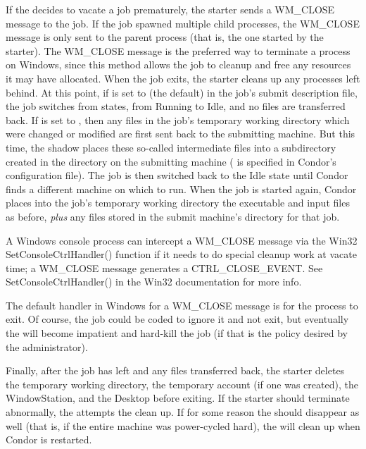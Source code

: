 If the  decides to vacate a job prematurely,
the starter sends a WM\_CLOSE message to the job.
If the job spawned multiple child processes, the WM\_CLOSE message is only
sent to the parent process (that is, the one started by the starter).
The
WM\_CLOSE message is the preferred way to terminate a process on Windows,
since this method allows the job to cleanup and free any resources it may
have allocated.
When the job exits, the starter cleans up any processes left behind.
At this point, if  is set to
 (the default) in the job's submit description file,
the job switches from states, from Running to Idle,
and no files are transferred back.
If  is set to , then any files
in the job's temporary working directory which were changed or modified are
first sent back to the submitting machine.
But this time, the shadow places these
so-called intermediate files into a subdirectory created in the
 directory on the submitting machine
( is specified in Condor's configuration file).
The job is then switched back to the Idle state until Condor finds
a different machine on which to run.
When the job is started again,
Condor places into the job's temporary working directory the executable
and input files as before,
\emph{plus} any files stored in the submit machine's  directory for that job.  

\Note A Windows console process can intercept a WM\_CLOSE message
via the Win32 SetConsoleCtrlHandler() function if it needs to do special
cleanup work at vacate time; a WM\_CLOSE message
generates a CTRL\_CLOSE\_EVENT.  See SetConsoleCtrlHandler() in the Win32
documentation for more info.

\Note The default handler in Windows for a WM\_CLOSE message is for the
process to exit.  Of course, the job could be coded to ignore it and not
exit, but eventually the  will become impatient and hard-kill
the job (if that is the policy desired by the administrator).

Finally, after the job has left and any files transferred back, the
starter deletes the temporary working directory, the temporary account
(if one was created), the WindowStation, and the Desktop before
exiting.  If the starter should terminate abnormally, the
 attempts the clean up.  If for some reason the
 should disappear as well (that is, if the entire
machine was power-cycled hard), the  will clean up when
Condor is restarted.

